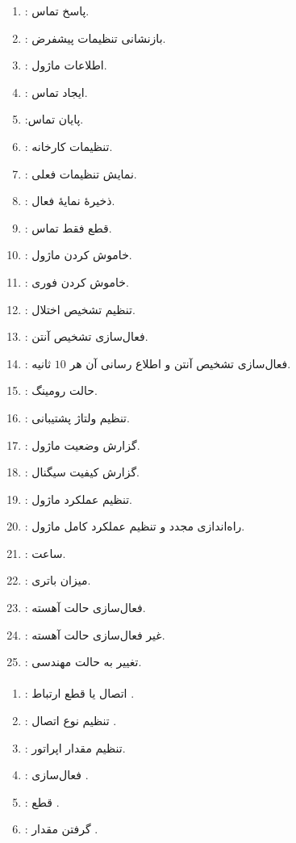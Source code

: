 \begin{enumerate}[nosep]
    \item {}: پاسخ تماس.
    \item {}: بازنشانی تنظیمات پیشفرض.
    \item {}: اطلاعات ماژول.
    \item {}: ایجاد تماس.
    \item {}:پایان تماس.
    \item {}: تنظیمات کارخانه.
    \item {}: نمایش تنظیمات فعلی.
    \item {}: ذخیرهٔ نمایهٔ فعال.
    \item {}: قطع فقط تماس.
    \item {}: خاموش کردن ماژول.
    \item {}: خاموش کردن فوری.
    \item {}: تنظیم تشخیص اختلال.
    \item {}: فعال‌سازی تشخیص آنتن.
    \item {}: فعال‌سازی تشخیص آنتن و اطلاع رسانی آن هر $10$
    ثانیه.
    \item {}: حالت رومینگ.
    \item {}: تنظیم ولتاژ پشتیبانی.
    \item {}: گزارش وضعیت ماژول.
    \item {}: گزارش کیفیت سیگنال.
    \item {}: تنظیم عملکرد ماژول.
    \item {}: راه‌اندازی مجدد و تنظیم عملکرد کامل ماژول.
    \item {}: ساعت.
    \item {}: میزان باتری.
    \item {}: فعال‌سازی حالت آهسته.
    \item {}: غیر فعال‌سازی حالت آهسته.
    \item {}: تغییر به حالت مهندسی.
\end{enumerate}

\paragraph{}\label{par3:subsubsec1:subsec1:sec2:chap5}
\begin{enumerate}[nosep]
    \item {}: اتصال یا قطع ارتباط .
    \item {}: تنظیم نوع اتصال .
    \item {}: تنظیم مقدار  اپراتور.
    \item {}: فعال‌سازی .
    \item {}: قطع .
    \item {}: گرفتن مقدار .
\end{enumerate}

